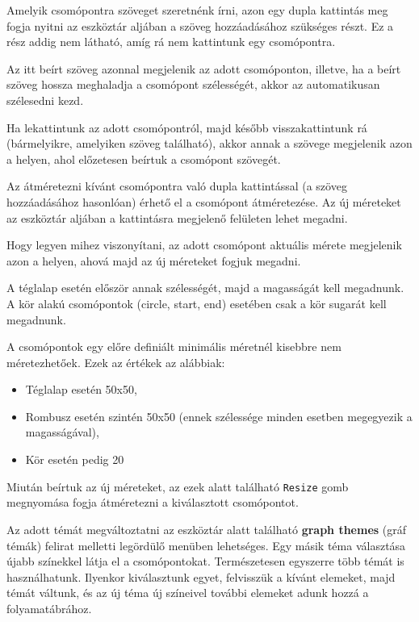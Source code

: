 
Amelyik csomópontra szöveget szeretnénk írni, azon egy dupla kattintás meg fogja nyitni az eszköztár aljában a szöveg hozzáadásához szükséges részt. Ez a rész addig nem látható, amíg rá nem kattintunk egy csomópontra.

Az itt beírt szöveg azonnal megjelenik az adott csomóponton, illetve, ha a beírt szöveg hossza meghaladja a csomópont szélességét, akkor az automatikusan szélesedni kezd.

Ha lekattintunk az adott csomópontról, majd később visszakattintunk rá (bármelyikre, amelyiken szöveg található), akkor annak a szövege megjelenik azon a helyen, ahol előzetesen beírtuk a csomópont szövegét.


Az átméretezni kívánt csomópontra való dupla kattintással (a szöveg hozzáadásához hasonlóan) érhető el a csomópont átméretezése. Az új méreteket az eszköztár aljában a kattintásra megjelenő felületen lehet megadni.

Hogy legyen mihez viszonyítani, az adott csomópont aktuális mérete megjelenik azon a helyen, ahová majd az új méreteket fogjuk megadni.

A téglalap esetén először annak szélességét, majd a magasságát kell megadnunk. A kör alakú csomópontok (circle, start, end) esetében csak a kör sugarát kell megadnunk.

A csomópontok egy előre definiált minimális méretnél kisebbre nem méretezhetőek. Ezek az értékek az alábbiak:
\begin{itemize}
\item Téglalap esetén 50x50,
\item Rombusz esetén szintén 50x50 (ennek szélessége minden esetben megegyezik a magasságával), 
\item Kör esetén pedig 20
\end{itemize}
Miután beírtuk az új méreteket, az ezek alatt található \texttt{Resize} gomb megnyomása fogja átméretezni a kiválasztott csomópontot.


Az adott témát megváltoztatni az eszköztár alatt található \textbf{graph themes} (gráf témák) felirat melletti legördülő menüben lehetséges. Egy másik téma választása újabb színekkel látja el a csomópontokat. Természetesen egyszerre több témát is használhatunk. Ilyenkor kiválasztunk egyet, felvisszük a kívánt elemeket, majd témát váltunk, és az új téma új színeivel további elemeket adunk hozzá a folyamatábrához.

